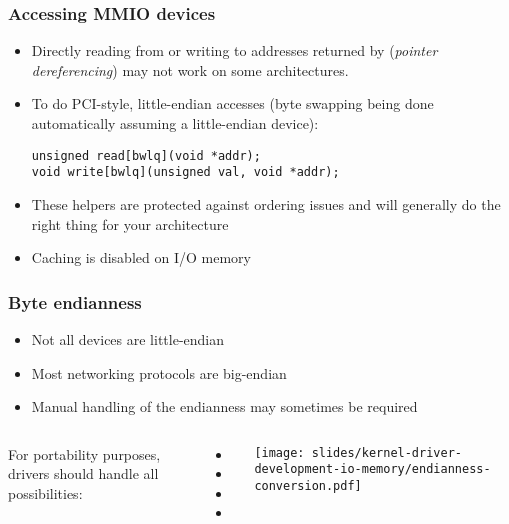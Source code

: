 \begin{frame}[fragile]
  \frametitle{Accessing MMIO devices}
  \begin{itemize}
  \item Directly reading from or writing to addresses returned by
     (\emph{pointer dereferencing}) may not work on some
    architectures.
  \item To do PCI-style, little-endian accesses (byte swapping being done
    automatically assuming a little-endian device):
\begin{verbatim}
unsigned read[bwlq](void *addr);
void write[bwlq](unsigned val, void *addr);
\end{verbatim}
  \item These helpers are protected against ordering issues and will
    generally do the right thing for your architecture
  \item Caching is disabled on I/O memory
  \end{itemize}
\end{frame}

\begin{frame}[fragile]
  \frametitle{Byte endianness}
  \begin{itemize}
  \item Not all devices are little-endian
  \item Most networking protocols are big-endian
  \item Manual handling of the endianness may sometimes be required
  \end{itemize}
  \begin{columns}
    For portability purposes, drivers should handle all possibilities:
    \begin{itemize}
    \item {}
    \item {}
    \item {}
    \item {}
    \end{itemize}
    \begin{center}
      \texttt{[image: slides/kernel-driver-development-io-memory/endianness-conversion.pdf]}
    \end{center}
  \end{columns}
\end{frame}

